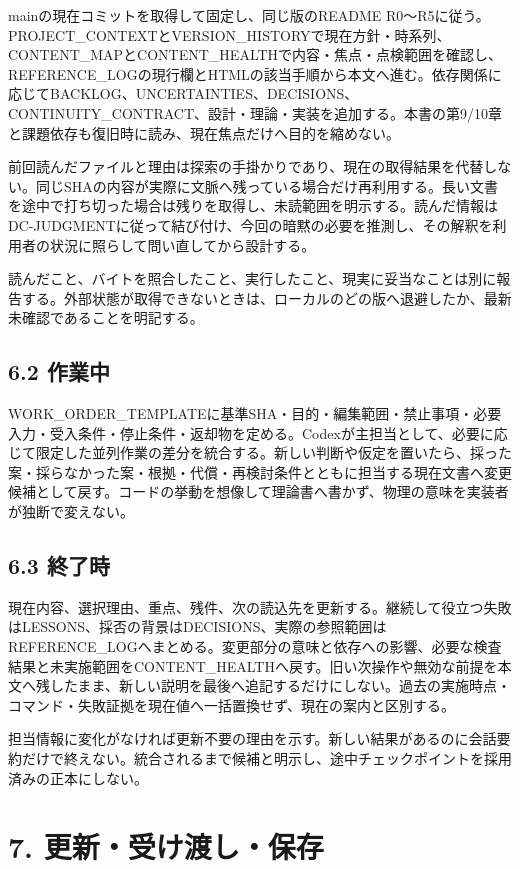 \documentclass[11pt,a4paper]{article}
\begin{document}
mainの現在コミットを取得して固定し、同じ版のREADME
R0〜R5に従う。PROJECT\_CONTEXTとVERSION\_HISTORYで現在方針・時系列、CONTENT\_MAPとCONTENT\_HEALTHで内容・焦点・点検範囲を確認し、REFERENCE\_LOGの現行欄とHTMLの該当手順から本文へ進む。依存関係に応じてBACKLOG、UNCERTAINTIES、DECISIONS、CONTINUITY\_CONTRACT、設計・理論・実装を追加する。本書の第9/10章と課題依存も復旧時に読み、現在焦点だけへ目的を縮めない。

前回読んだファイルと理由は探索の手掛かりであり、現在の取得結果を代替しない。同じSHAの内容が実際に文脈へ残っている場合だけ再利用する。長い文書を途中で打ち切った場合は残りを取得し、未読範囲を明示する。読んだ情報はDC-JUDGMENTに従って結び付け、今回の暗黙の必要を推測し、その解釈を利用者の状況に照らして問い直してから設計する。

読んだこと、バイトを照合したこと、実行したこと、現実に妥当なことは別に報告する。外部状態が取得できないときは、ローカルのどの版へ退避したか、最新未確認であることを明記する。

\subsection{6.2 作業中}\label{ux4f5cux696dux4e2d}

WORK\_ORDER\_TEMPLATEに基準SHA・目的・編集範囲・禁止事項・必要入力・受入条件・停止条件・返却物を定める。Codexが主担当として、必要に応じて限定した並列作業の差分を統合する。新しい判断や仮定を置いたら、採った案・採らなかった案・根拠・代償・再検討条件とともに担当する現在文書へ変更候補として戻す。コードの挙動を想像して理論書へ書かず、物理の意味を実装者が独断で変えない。

\subsection{6.3 終了時}\label{ux7d42ux4e86ux6642}

現在内容、選択理由、重点、残件、次の読込先を更新する。継続して役立つ失敗はLESSONS、採否の背景はDECISIONS、実際の参照範囲はREFERENCE\_LOGへまとめる。変更部分の意味と依存への影響、必要な検査結果と未実施範囲をCONTENT\_HEALTHへ戻す。旧い次操作や無効な前提を本文へ残したまま、新しい説明を最後へ追記するだけにしない。過去の実施時点・コマンド・失敗証拠を現在値へ一括置換せず、現在の案内と区別する。

担当情報に変化がなければ更新不要の理由を示す。新しい結果があるのに会話要約だけで終えない。統合されるまで候補と明示し、途中チェックポイントを採用済みの正本にしない。

\section{7.
更新・受け渡し・保存}\label{ux66f4ux65b0ux53d7ux3051ux6e21ux3057ux4fddux5b58}
\end{document}
